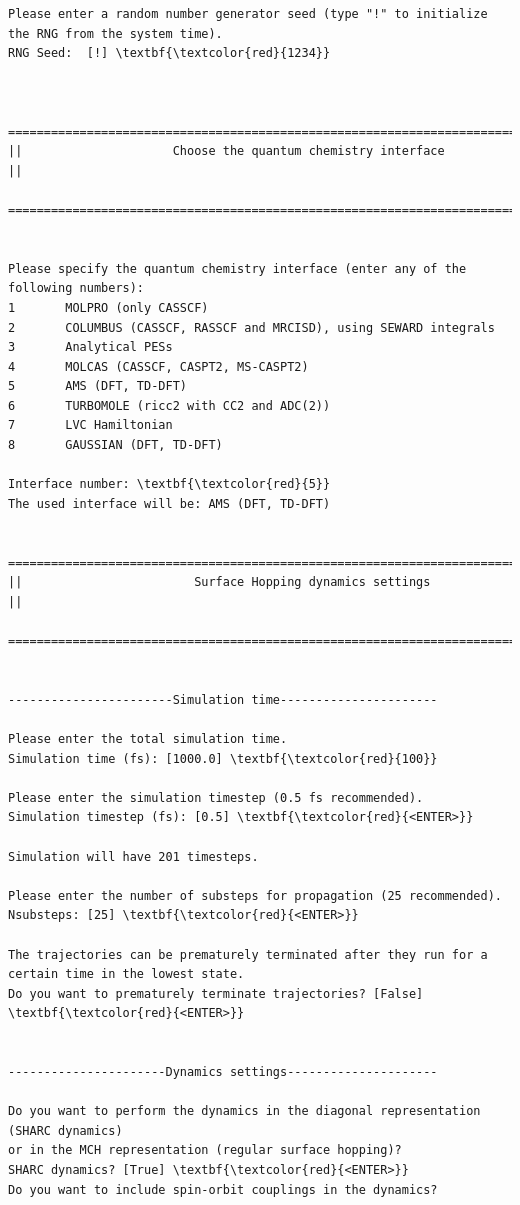 \documentclass[a4paper,11pt,DIV=15,openany]{scrbook}
\begin{document}
\begin{oframed}
\begin{Verbatim}[commandchars=\\\{\}]
Please enter a random number generator seed (type "!" to initialize the RNG from the system time).
RNG Seed:  [!] \textbf{\textcolor{red}{1234}}


  ================================================================================
||                     Choose the quantum chemistry interface                     ||
  ================================================================================


Please specify the quantum chemistry interface (enter any of the following numbers):
1       MOLPRO (only CASSCF)
2       COLUMBUS (CASSCF, RASSCF and MRCISD), using SEWARD integrals
3       Analytical PESs
4       MOLCAS (CASSCF, CASPT2, MS-CASPT2)
5       AMS (DFT, TD-DFT)
6       TURBOMOLE (ricc2 with CC2 and ADC(2))
7       LVC Hamiltonian
8       GAUSSIAN (DFT, TD-DFT)

Interface number: \textbf{\textcolor{red}{5}}
The used interface will be: AMS (DFT, TD-DFT)

  ================================================================================
||                        Surface Hopping dynamics settings                       ||
  ================================================================================


-----------------------Simulation time----------------------

Please enter the total simulation time.
Simulation time (fs): [1000.0] \textbf{\textcolor{red}{100}}

Please enter the simulation timestep (0.5 fs recommended).
Simulation timestep (fs): [0.5] \textbf{\textcolor{red}{<ENTER>}}

Simulation will have 201 timesteps.

Please enter the number of substeps for propagation (25 recommended).
Nsubsteps: [25] \textbf{\textcolor{red}{<ENTER>}}

The trajectories can be prematurely terminated after they run for a certain time in the lowest state. 
Do you want to prematurely terminate trajectories? [False] \textbf{\textcolor{red}{<ENTER>}}


----------------------Dynamics settings---------------------

Do you want to perform the dynamics in the diagonal representation (SHARC dynamics) 
or in the MCH representation (regular surface hopping)?
SHARC dynamics? [True] \textbf{\textcolor{red}{<ENTER>}}
Do you want to include spin-orbit couplings in the dynamics?


\end{Verbatim}
\end{oframed}
\end{document}

